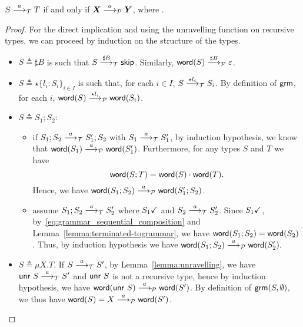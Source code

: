 \begin{lemma}
  \label{lem:transitions_mimic}
  $S \LTSderives T$ if and only if $\vec X \LTSderivesP \vec Y$, 
  where \grmcontext.
\end{lemma}
%
\begin{proof}
	For the direct implication and using the unravelling
	function on recursive types, we can proceed by induction
	on the structure of the types. 
	
	\begin{itemize}
		\item $S\triangleq\sharp B$ is such that $S \LTSderives[\sharp B] \skipk$.
		Similarly, $\word(S) \LTSderivesP[\sharp B] \varepsilon$.
		\item $S\triangleq\star\{l_i\colon S_i\}_{i\in I}$ is such that, for each $i\in I$,
		$S \LTSderives[\star l_i] S_i$. By definition of $\grm$, for each $i$, 
		$\word(S) \LTSderivesP[\star l_i] \word(S_i)$.
		\item $S\triangleq S_1;S_2$:
		\begin{itemize}
			\item if $S_1;S_2\LTSderives S_1';S_2$ with $S_1\LTSderives S_1'$,
			by induction hypothesis, we know that $\word(S_1) \LTSderivesP \word(S_1')$.
			Furthermore, for any types $S$ and $T$ we have
			\begin{equation}
			\label{eq:grammar_sequential_composition}
				\word(S;T) = \word(S)\cdot\word(T).	
			\end{equation}
			Hence, we have $\word(S_1;S_2) \LTSderivesP \word(S_1';S_2)$.
			\item assume $S_1;S_2\LTSderives S_2'$ where 
				$\DONE{S_1}$ and $S_2\LTSderives S_2'$.
			Since $\DONE{S_1}$, 
			by~\eqref{eq:grammar_sequential_composition} and
			Lemma~\ref{lemma:terminated-togrammar}, 
			we have $\word(S_1;S_2) = \word(S_2)$.
			Thus, by induction hypothesis we have 
			$\word(S_1;S_2) \LTSderivesP \word(S_2').$
		\end{itemize}
		\item $S\triangleq\mu X.T$. If $S\LTSderives S'$, by Lemma~\ref{lemma:unravelling},
		we have $\Unravel\ S \LTSderives S'$ and $\Unravel\ S$ is not a recursive
		type, hence by induction hypothesis, we have
		$\word(\Unravel\ S)\LTSderivesP \word(S')$.
		By definition of $\grm(S,\emptyset)$, we thus have
		$\word(S) = X \LTSderivesP \word(S')$. \smallskip
	\end{itemize}

\end{proof}
